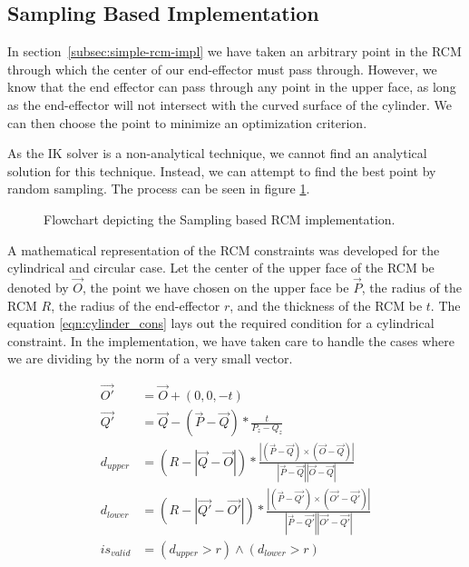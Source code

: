 \documentclass[BTech]{iitmdiss}
\begin{document}
    \subsection{Sampling Based Implementation}

    In section~\ref{subsec:simple-rcm-impl} we have taken an arbitrary point in the RCM through which the center of our
    end-effector must pass through.
    However, we know that the end effector can pass through any point in the upper face,
    as long as the end-effector will not intersect with the curved surface of the cylinder.
    We can then choose the point to minimize an optimization criterion.

    As the IK solver is a non-analytical technique, we cannot find an analytical solution for this technique.
    Instead, we can attempt to find the best point by random sampling. The process can be seen in figure \ref{fig:sampling_flowchart}.

    \begin{figure}
        \centering

        

        \caption{Flowchart depicting the Sampling based RCM implementation.}
        \label{fig:sampling_flowchart}
    \end{figure}

    A mathematical representation of the RCM constraints was developed for the cylindrical and circular case.
    Let the center of the upper face of the RCM be denoted by $\vec{O}$, the point we have chosen on the upper face be $\vec{P}$,
    the radius of the RCM $R$, the radius of the end-effector $r$, and the thickness of the RCM be $t$.
    The equation \ref{eqn:cylinder_cons} lays out the required condition for a cylindrical constraint.
    In the implementation, we have taken care to handle the cases where we are dividing by the norm of a very small vector.

    \begin{align}
        \vec{O'} &= \vec{O} + (0, 0, -t) \\
        \vec{Q'} &= \vec{Q} - (\vec{P} - \vec{Q}) * \frac{t}{P_z - Q_z} \\
        d_{upper} &= (R - |\vec{Q} - \vec{O}|) * \frac{|(\vec{P} - \vec{Q}) \times (\vec{O} - \vec{Q})|}{|\vec{P} - \vec{Q}| |\vec{O} - \vec{Q}|} \\
        d_{lower} &= (R - |\vec{Q'} - \vec{O'}|) * \frac{|(\vec{P} - \vec{Q'}) \times (\vec{O'} - \vec{Q'})|}{|\vec{P} - \vec{Q'}| |\vec{O'} - \vec{Q'}|} \\
        is_{valid} &= (d_{upper} > r) \land (d_{lower} > r)\label{eqn:cylinder_cons}
    \end{align}
\end{document}
